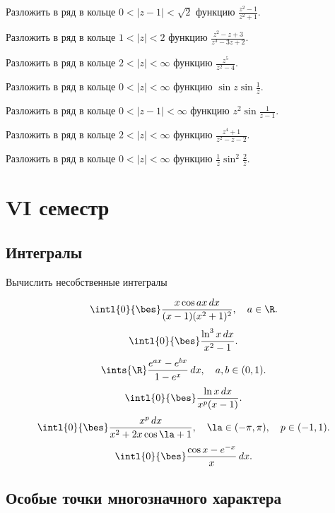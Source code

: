 \documentclass[a4paper]{article}
\begin{document}
\begin{problem}
Разложить в ряд в кольце $0<|z-1|<\sqrt2$ функцию $\frac{z^2-1}{z^2+1}$.
\end{problem}

\begin{problem}
Разложить в ряд в кольце $1<|z|<2$ функцию $\frac{z^2-z+3}{z^3-3z+2}$.
\end{problem}

\begin{problem}
Разложить в ряд в кольце $2<|z|<\infty$ функцию $\frac{z^5}{z^2-4}$.
\end{problem}

\begin{problem}
Разложить в ряд в кольце $0<|z|<\infty$ функцию $\sin z\sin\frac1z$.
\end{problem}

\begin{problem}
Разложить в ряд в кольце $0<|z-1|<\infty$ функцию $z^2\sin\frac{1}{z-1}$.
\end{problem}

\begin{problem}
Разложить в ряд в кольце $2<|z|<\infty$ функцию $\frac{z^4+1}{z^2-z-2}$.
\end{problem}

\begin{problem}
Разложить в ряд в кольце $0<|z|<\infty$ функцию $\frac1z\sin^2\frac2z$.
\end{problem}

\section{VI семестр}

\subsection{Интегралы}

Вычислить несобственные интегралы

$$\intl{0}{\bes}\frac{x\cos ax\,dx}{(x-1)(x^2+1)^2},\quad a \in \R.$$
$$\intl{0}{\bes}\frac{\ln^3x\,dx}{x^2-1}.$$
$$\ints{\R}\frac{e^{ax} - e^{bx}}{1-e^x}\,dx,\quad a,b \in (0,1).$$
$$\intl{0}{\bes}\frac{\ln x\,dx}{x^p(x-1)}.$$
$$\intl{0}{\bes}\frac{x^p\,dx}{x^2+2x\cos \la + 1}, \quad \la\in (-\pi,\pi), \quad p \in (-1,1).$$
$$\intl{0}{\bes}\frac{\cos x - e^{-x}}{x}\,dx.$$

\subsection{Особые точки многозначного характера}
\end{document}

